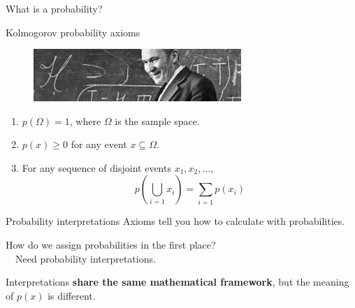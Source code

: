 \documentclass[
aspectratio=169,
14pt,
professionalfonts
]{beamer}
\newcommand{\arrow}{~\ding{220}~}
\begin{document}
\begin{frame}
\centering
\Large
What is a probability?
\end{frame}

\begin{frame}{Kolmogorov probability axioms}
\begin{figure}
    \centering
    \includegraphics[width=0.7\textwidth]{../plots/kolmogorov.jpg}
\end{figure}
\begin{enumerate}
  \item $ p(\Omega) = 1 $, where \( \Omega \) is the sample space.
  \item $ p(x) \geq 0 $ for any event \( x \subseteq \Omega \).
  \item For any sequence of disjoint events \( x_1, x_2, \dots \),
        $$
        p\left( \bigcup_{i=1} x_i \right) = \sum_{i=1} p(x_i)
        $$
\end{enumerate}
\end{frame}




\begin{frame}{Probability interpretations}
    Axioms tell you how to calculate with probabilities.
    
    \vspace{0.5cm}
    How do we assign probabilities in the first place? \\
    \arrow Need probability interpretations.

    \vspace{0.5cm}
    Interpretations \textbf{share the same mathematical framework}, but the meaning of $p(x)$ is different.
\end{frame}
\end{document}
